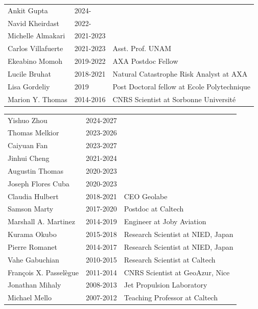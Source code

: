 \documentclass[10pt]{article}
\begin{document}
\begin{table}[h!]
 \renewcommand{\arraystretch}{0.5}

 
\begin{tabular}{L{3.75cm}L{2cm}D{7cm}}
\color{groy}Ankit Gupta           & 2024-      &  \\
\color{groy}Navid Kheirdast       & 2022-      &  \\
\color{gray}Michelle Almakari     & 2021-2023  &  \\
\color{gray}Carlos Villafuerte    & 2021-2023  &  Asst. Prof. UNAM\\
\color{gray}Ekeabino Momoh   	  & 2019-2022  &  AXA Postdoc Fellow\\
\color{gray}Lucile Bruhat    	  & 2018-2021  &  Natural Catastrophe Risk Analyst at AXA\\
\color{gray}Lisa Gordeliy    	  & 2019       &  Post Doctoral fellow at Ecole Polytechnique\\
\color{gray}Marion Y. Thomas 	  & 2014-2016  &  CNRS Scientist at Sorbonne Université\\[16pt]
\end{tabular}


\begin{tabular}{L{3.75cm}L{2cm}D{7cm}}
\color{groy}Yishuo Zhou           & 2024-2027&   \\
\color{groy}Thomas Melkior        & 2023-2026&   \\
\color{groy}Caiyuan Fan           & 2023-2027&   \\
\color{groy}Jinhui Cheng          & 2021-2024&   \\
\color{groy}Augustin Thomas       & 2020-2023&   \\
\color{groy}Joseph Flores Cuba    & 2020-2023&   \\
\color{gray}Claudia Hulbert    	  & 2018-2021&  CEO Geolabe\\
\color{gray}Samson Marty    	      & 2017-2020&  Postdoc at Caltech\\
\color{gray}Marshall A. Martinez  & 2014-2019&  Engineer at Joby Aviation \\
\color{gray}Kurama Okubo    	      & 2015-2018&  Research Scientist at NIED, Japan\\
\color{gray}Pierre Romanet        & 2014-2017&  Research Scientist at NIED, Japan\\
\color{gray}Vahe Gabuchian        & 2010-2015&  Research Scientist at Caltech\\
\color{gray}François X. Passelègue& 2011-2014&  CNRS Scientist at GeoAzur, Nice\\
\color{gray}Jonathan Mihaly       & 2008-2013&  Jet Propulsion Laboratory\\
\color{gray}Michael Mello         & 2007-2012&  Teaching Professor at Caltech\\[16pt]
\end{tabular}


\end{table}
\end{document}
